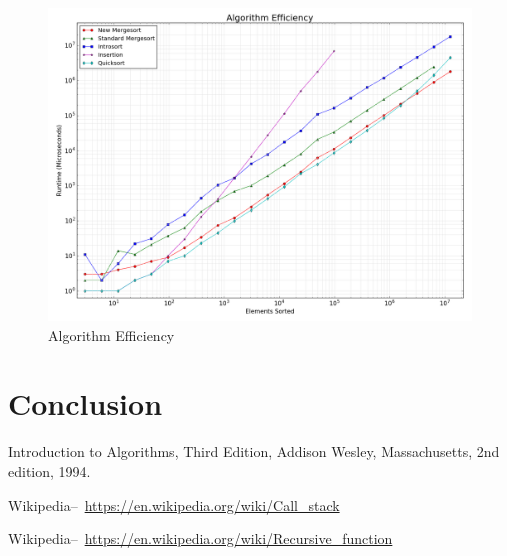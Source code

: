 \documentclass[12pt]{article}
\begin{document}
	\begin{figure}[H]
		\centering
		\includegraphics[width=6in]{figure_3.png}
		\caption{Algorithm Efficiency}
		\label{fig:algeff}
	\end{figure}
	
\section{Conclusion}

\pagebreak

\begin{thebibliography}{9}
	Introduction to Algorithms, Third Edition,
	Addison Wesley, Massachusetts,
	2nd edition,
	1994.
	
	Wikipedia–~\url{https://en.wikipedia.org/wiki/Call_stack}
	
	Wikipedia–~\url{https://en.wikipedia.org/wiki/Recursive_function}
	
\end{thebibliography}
\end{document}

